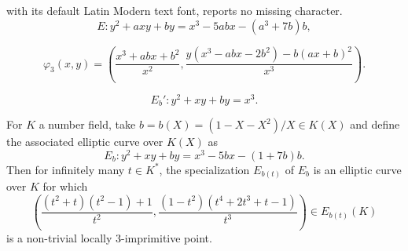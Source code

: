 \documentclass[10pt,a4paper]{amsart}
\begin{document}
with its default Latin Modern text font, reports no missing character.
\begin{equation}
\label{3-isogcurve-ab}
E: y^2+axy+by=x^3-5abx-(a^3+7b)b,
\end{equation}

\begin{equation}
\label{explicit3isog}
\varphi_3(x,y)= \left(
\frac{x^3+abx+b^2}{x^2},
    \frac{y(x^3-abx-2b^2)-b(ax+b)^2}{x^3}\right).
\end{equation}

\begin{equation}
\label{Deuringnf}
E_b': y^2+xy+by=x^3.
\end{equation}

\begin{theorem}
\label{ell=3}
For $K$ a number field, take $b=b(X)=(1-X-X^2)/X\in K(X)$ and 
define the associated elliptic curve over $K(X)$ as
$$
E_{b}: y^2+xy+by=x^3-5bx-(1+7b)b.
$$  
Then for infinitely many $t\in K^*$, the specialization $E_{b(t)}$
of $E_b$ is an elliptic curve over $K$ for which
\begin{equation}
\label{pointPt}
    \left(\frac{(t^2+t)(t^2-1)+1}{t^2},
    \frac{(1-t^2)\left(t^4+2 t^3+t-1\right)}{t^3}\right)
\in E_{b(t)}(K)
\end{equation} 
is a non-trivial locally 3-imprimitive point.
\end{theorem}
\end{document}
